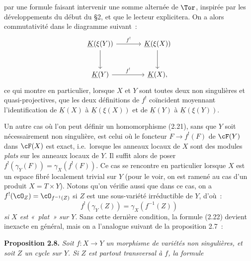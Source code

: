 par une
formule faisant intervenir une somme alternée de $\Tor$, inspirée par les développements du début du \S 2, et que le lecteur explicitera. On a alors commutativité dans le diagramme suivant~:
\[
\begin{tikzcd}[column sep=large,row sep=large]
\underline K(\xi(Y)) \arrow[r,"f^!"] \arrow[d] & \underline K(\xi(X)) \arrow[d]\\
\underline K(Y) \arrow[r,"f^!"] & \underline K(X){,}
\end{tikzcd}
\]
ce qui montre en particulier, lorsque $X$ et $Y$ sont toutes deux non singulières et quasi-projectives, que les deux définitions de $f^!$ coïncident moyennant l'identification de $\underline K(X)$ à $\underline K(\xi(X))$ et de $\underline K(Y)$ à $\underline K(\xi(Y))$.

Un autre cas où l'on peut définir un homomorphisme (2.21), sans que $Y$ soit nécessairement non singulière, est celui où le foncteur $F\to f^!(F)$ de $\cF(Y)$ dans $\cF(X)$ est exact, i.e.\ lorsque les anneaux locaux de $X$ sont des modules \emph{plats} sur les anneaux locaux de $Y$. Il suffit alors de poser $f^!(\gamma_Y(F))=\gamma_X(f^!(F))$.
Ce cas se rencontre en particulier lorsque $X$ est un espace fibré localement trivial sur $Y$ (pour le voir, on est ramené au cas d'un produit $X=T\times Y$). Notons qu'on vérifie aussi que dans ce cas, on a $f^!(\cO_Z)=\cO_{f^{-1}(Z)}$ si $Z$ est une sous-variété irréductible de $Y$, d'où~:
\begin{equation}\tag{2.22}
 f^!(\gamma_Y(Z))=\gamma_X(f^{-1}(Z))
\end{equation}
\emph{si $X$ est «~plat~» sur $Y$}. Sans cette dernière condition, la formule (2.22) devient inexacte en général, mais on a l'analogue suivant de la proposition 2.7~:

\textbf{Proposition 2.8.}
\emph{Soit $f:X\longrightarrow Y$ un morphisme de variétés non singulières, et soit $Z$ un cycle sur $Y$. Si $Z$ est partout transversal à $f$, la formule}
